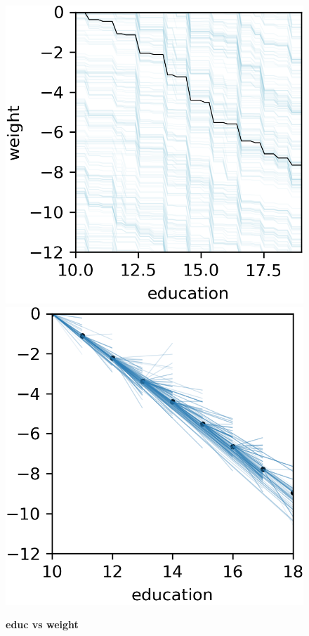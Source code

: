 \documentclass[12pt]{article}
\begin{document}
\begin{figure}[htbp]
\begin{center}
\includegraphics[scale=0.7]{images/education_vs_weight_pdp.png}
\includegraphics[scale=0.7]{images/education_vs_weight_stratpd.png}
\caption{{\bf  educ vs weight}}
\label{fig:education_vs_weight}
\end{center}
\end{figure}
\end{document}
